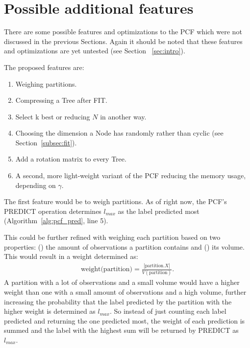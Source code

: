 \section{Possible additional features}
\label{sec:features}

There are some possible features and optimizations to the
PCF which were not discussed in the previous Sections.
Again it should be noted that these features and
optimizations are yet untested (see Section~%
\ref{sec:intro}).

The proposed features are:

\begin{enumerate}

  \item Weighing partitions.

  \item Compressing a Tree after FIT.

  \item Select k best or reducing $N$ in another way.

  \item Choosing the dimension a Node has randomly rather
        than cyclic (see Section~\ref{subsec:fit}).

  \item Add a rotation matrix to every Tree.

  \item A second, more light-weight variant of the PCF
        reducing the memory usage, depending on $\gamma$.

\end{enumerate}

The first feature would be to weigh partitions. As of
right now, the PCF's PREDICT operation determines $l_{max}$
as the label predicted most (Algorithm~\ref{alg:pcf_pred},
line 5).

This could be further refined with weighing each partition
based on two properties: () the amount
of observations a partition contains and ()
its volume. This would result in a weight determined as:
\begin{align}
  \text{weight(partition)} = \frac{|\text{partition}.X|}
  {V(\text{partition})}.
\end{align}
A partition with a lot of observations and a small
volume would have a higher weight than one with a small
amount of observations and a high volume, further
increasing the probability that the label predicted by the
partition with the higher weight is determined as
$l_{max}$. So instead of just counting each label predicted
and returning the one predicted most, the weight of each
prediction is summed and the label with the highest sum
will be returned by PREDICT as $l_{max}$.

